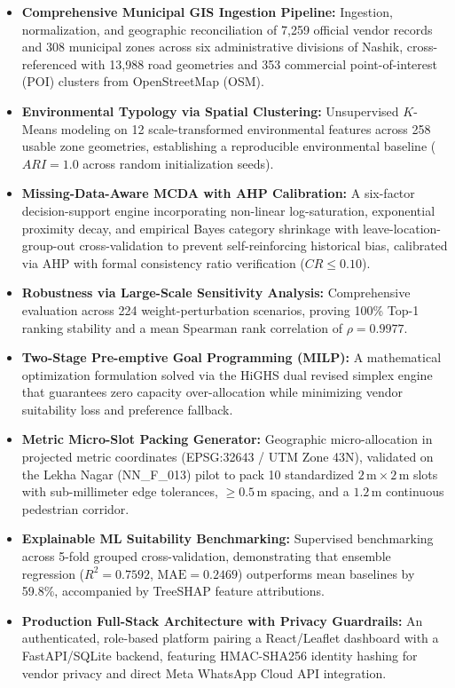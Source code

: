 \begin{itemize}
    \item \textbf{Comprehensive Municipal GIS Ingestion Pipeline:} Ingestion, normalization, and geographic reconciliation of 7,259 official vendor records and 308 municipal zones across six administrative divisions of Nashik, cross-referenced with 13,988 road geometries and 353 commercial point-of-interest (POI) clusters from OpenStreetMap (OSM).
    \item \textbf{Environmental Typology via Spatial Clustering:} Unsupervised $K$-Means modeling on 12 scale-transformed environmental features across 258 usable zone geometries, establishing a reproducible environmental baseline ($ARI = 1.0$ across random initialization seeds).
    \item \textbf{Missing-Data-Aware MCDA with AHP Calibration:} A six-factor decision-support engine incorporating non-linear log-saturation, exponential proximity decay, and empirical Bayes category shrinkage with leave-location-group-out cross-validation to prevent self-reinforcing historical bias, calibrated via AHP with formal consistency ratio verification ($CR \le 0.10$).
    \item \textbf{Robustness via Large-Scale Sensitivity Analysis:} Comprehensive evaluation across 224 weight-perturbation scenarios, proving 100\% Top-1 ranking stability and a mean Spearman rank correlation of $\rho = 0.9977$.
    \item \textbf{Two-Stage Pre-emptive Goal Programming (MILP):} A mathematical optimization formulation solved via the HiGHS dual revised simplex engine that guarantees zero capacity over-allocation while minimizing vendor suitability loss and preference fallback.
    \item \textbf{Metric Micro-Slot Packing Generator:} Geographic micro-allocation in projected metric coordinates (EPSG:32643 / UTM Zone 43N), validated on the Lekha Nagar (NN\_F\_013) pilot to pack 10 standardized $2\,\text{m} \times 2\,\text{m}$ slots with sub-millimeter edge tolerances, $\ge 0.5\,\text{m}$ spacing, and a $1.2\,\text{m}$ continuous pedestrian corridor.
    \item \textbf{Explainable ML Suitability Benchmarking:} Supervised benchmarking across 5-fold grouped cross-validation, demonstrating that ensemble regression ($R^2 = 0.7592$, $\text{MAE} = 0.2469$) outperforms mean baselines by 59.8\%, accompanied by TreeSHAP feature attributions.
    \item \textbf{Production Full-Stack Architecture with Privacy Guardrails:} An authenticated, role-based platform pairing a React/Leaflet dashboard with a FastAPI/SQLite backend, featuring HMAC-SHA256 identity hashing for vendor privacy and direct Meta WhatsApp Cloud API integration.
\end{itemize}


